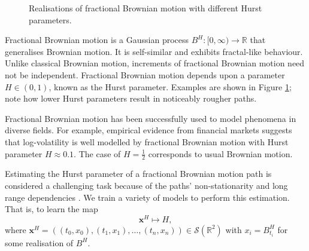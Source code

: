 \documentclass{article}
\theoremstyle{plain}
\theoremstyle{definition}
\begin{document}
\begin{figure}
	\captionsetup{width=0.9\linewidth}
	\caption{Realisations of fractional Brownian motion with different Hurst parameters.}
	\label{fig:simulation}
\end{figure} 

Fractional Brownian motion \cite{mishura2008stochastic} is a Gaussian process $B^H \colon [0,\infty) \rightarrow \mathbb{R}$ that generalises Brownian motion. It is self-similar and exhibits fractal-like behaviour. Unlike classical Brownian motion, increments of fractional Brownian motion need not be independent. Fractional Brownian motion depends upon a parameter $H \in (0, 1)$, known as the Hurst parameter. Examples are shown in Figure \ref{fig:simulation}; note how lower Hurst parameters result in noticeably rougher paths.

Fractional Brownian motion has been successfully used to model phenomena in diverse fields. For example, empirical evidence from financial markets \cite{gatheral2014volatility} suggests that log-volatility is well modelled by fractional Brownian motion with Hurst parameter $H \approx 0.1$. The case of $H = \frac{1}{2}$ corresponds to usual Brownian motion.  %

Estimating the Hurst parameter of a fractional Brownian motion path is considered a challenging task because of the paths' non-stationarity and long range dependencies \cite{lacasa2009visibility}. We train a variety of models to perform this estimation. That is, to learn the map
\begin{equation*}
\mathbf x^H \mapsto H,
\end{equation*}
where $\mathbf x^H = ((t_0, x_0), (t_1, x_1), \ldots, (t_n, x_n)) \in \mathcal S(\mathbb R^2)$ with $x_i= B^H_{t_i}$ for some realisation of $B^H$.
\end{document}
